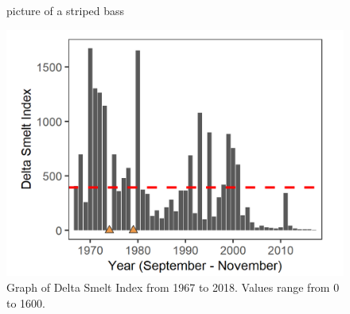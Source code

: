 \documentclass[
]{book}
\begin{document}
\begin{panel-grid}
\begin{columns-nocenter}
\begin{column800}
\begin{figure}
{}

\caption{picture of a striped bass}\label{fig:unnamed-chunk-123}
\end{figure}

\end{column800}

\end{columns-nocenter}

\begin{columns-nocenter}

\begin{column800}

\begin{expand}

\begin{figure}
\includegraphics[width=15.25in]{figures/FMWT_DS_1966} \caption{Graph of Delta Smelt Index from 1967 to 2018. Values range from 0 to 1600.}\label{fig:unnamed-chunk-124}
\end{figure}

\end{expand}

\end{column800}

\begin{column40}

~

\end{column40}

\begin{column800}

\begin{expand}


\end{expand}
\end{column800}
\end{columns-nocenter}
\end{panel-grid}
\end{document}
